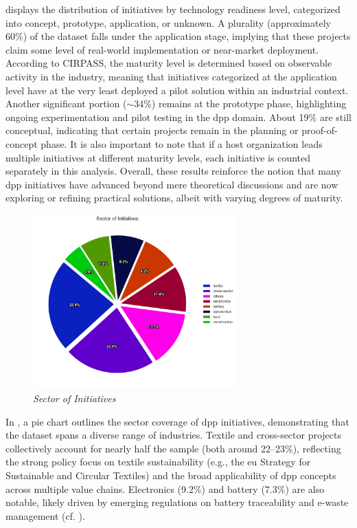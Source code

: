  displays the distribution of initiatives by technology readiness level, categorized into concept, prototype, application, or unknown. A plurality (approximately 60\%) of the dataset falls under the application stage, implying that these projects claim some level of real-world implementation or near-market deployment. According to CIRPASS, the maturity level is determined based on observable activity in the industry, meaning that initiatives categorized at the application level have at the very least deployed a pilot solution within an industrial context. \autocite{CIRPASS.2024} Another significant portion ($\sim$34\%) remains at the prototype phase, highlighting ongoing experimentation and pilot testing in the \ac{dpp} domain. About 19\% are still conceptual, indicating that certain projects remain in the planning or proof-of-concept phase. It is also important to note that if a host organization leads multiple initiatives at different maturity levels, each initiative is counted separately in this analysis. Overall, these results reinforce the notion that many \ac{dpp} initiatives have advanced beyond mere theoretical discussions and are now exploring or refining practical solutions, albeit with varying degrees of maturity.

\begin{figure}[htbp]
  \centering
  \includegraphics[width=0.7\textwidth]{figures/initiatives_sector.png}
  \caption{%
    \textit{Sector of Initiatives} 
  }
  \label{fig:initiatives_sector}
\end{figure}

In , a pie chart outlines the sector coverage of \ac{dpp} initiatives, demonstrating that the dataset spans a diverse range of industries. Textile and cross-sector projects collectively account for nearly half the sample (both around 22–23\%), reflecting the strong policy focus on textile sustainability (e.g., the \ac{eu} Strategy for Sustainable and Circular Textiles) and the broad applicability of \ac{dpp} concepts across multiple value chains. Electronics (9.2\%) and battery (7.3\%) are also notable, likely driven by emerging regulations on battery traceability and e-waste management (cf. ).

